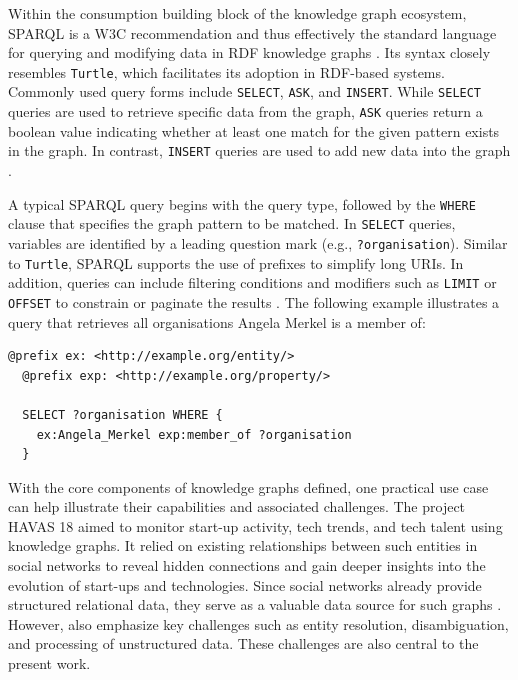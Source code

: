 \documentclass[a4paper,oneside,bibliography=totoc]{scrbook}
\begin{document}
Within the consumption building block of the knowledge graph ecosystem, \ac{SPARQL} is a W3C recommendation and thus effectively the standard language for querying and modifying data in RDF knowledge graphs \cite{Prudhommeaux2008}. Its syntax closely resembles \texttt{Turtle}, which facilitates its adoption in RDF-based systems. Commonly used query forms include \texttt{SELECT}, \texttt{ASK}, and \texttt{INSERT}. While \texttt{SELECT} queries are used to retrieve specific data from the graph, \texttt{ASK} queries return a boolean value indicating whether at least one match for the given pattern exists in the graph. In contrast, \texttt{INSERT} queries are used to add new data into the graph \cite{VillazonTerrazas2017}.

A typical \ac{SPARQL} query begins with the query type, followed by the \texttt{WHERE} clause that specifies the graph pattern to be matched. In \texttt{SELECT} queries, variables are identified by a leading question mark (e.g., \texttt{?organisation}). Similar to \texttt{Turtle}, \ac{SPARQL} supports the use of prefixes to simplify long \acp{URI}. In addition, queries can include filtering conditions and modifiers such as \texttt{LIMIT} or \texttt{OFFSET} to constrain or paginate the results \cite{VillazonTerrazas2017}. The following example illustrates a query that retrieves all organisations Angela Merkel is a member of:

\begin{lstlisting}[language=SPARQL, caption=Example of a \ac{SPARQL} Query, label=lst:turtle_example]
  @prefix ex: <http://example.org/entity/>
  @prefix exp: <http://example.org/property/>
  
  SELECT ?organisation WHERE {
    ex:Angela_Merkel exp:member_of ?organisation
  }
\end{lstlisting}

With the core components of knowledge graphs defined, one practical use case can help illustrate their capabilities and associated challenges. The project HAVAS 18 aimed to monitor start-up activity, tech trends, and tech talent using knowledge graphs. It relied on existing relationships between such entities in social networks to reveal hidden connections and gain deeper insights into the evolution of start-ups and technologies. Since social networks already provide structured relational data, they serve as a valuable data source for such graphs \cite{Monti2017}. However, \citet{Monti2017} also emphasize key challenges such as entity resolution, disambiguation, and processing of unstructured data. These challenges are also central to the present work.
\end{document}

